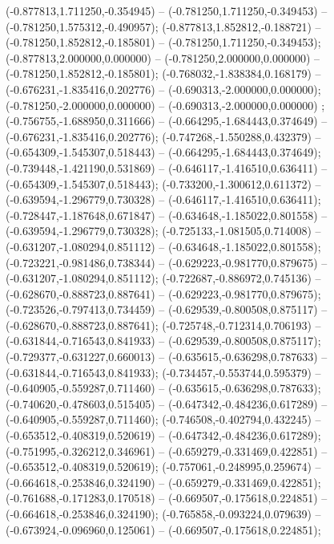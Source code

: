  (-0.877813,1.711250,-0.354945) -- (-0.781250,1.711250,-0.349453) -- (-0.781250,1.575312,-0.490957);
 (-0.877813,1.852812,-0.188721) -- (-0.781250,1.852812,-0.185801) -- (-0.781250,1.711250,-0.349453);
 (-0.877813,2.000000,0.000000) -- (-0.781250,2.000000,0.000000) -- (-0.781250,1.852812,-0.185801);
 (-0.768032,-1.838384,0.168179) -- (-0.676231,-1.835416,0.202776) -- (-0.690313,-2.000000,0.000000);
 (-0.781250,-2.000000,0.000000) -- (-0.690313,-2.000000,0.000000) ;
 (-0.756755,-1.688950,0.311666) -- (-0.664295,-1.684443,0.374649) -- (-0.676231,-1.835416,0.202776);
 (-0.747268,-1.550288,0.432379) -- (-0.654309,-1.545307,0.518443) -- (-0.664295,-1.684443,0.374649);
 (-0.739448,-1.421190,0.531869) -- (-0.646117,-1.416510,0.636411) -- (-0.654309,-1.545307,0.518443);
 (-0.733200,-1.300612,0.611372) -- (-0.639594,-1.296779,0.730328) -- (-0.646117,-1.416510,0.636411);
 (-0.728447,-1.187648,0.671847) -- (-0.634648,-1.185022,0.801558) -- (-0.639594,-1.296779,0.730328);
 (-0.725133,-1.081505,0.714008) -- (-0.631207,-1.080294,0.851112) -- (-0.634648,-1.185022,0.801558);
 (-0.723221,-0.981486,0.738344) -- (-0.629223,-0.981770,0.879675) -- (-0.631207,-1.080294,0.851112);
 (-0.722687,-0.886972,0.745136) -- (-0.628670,-0.888723,0.887641) -- (-0.629223,-0.981770,0.879675);
 (-0.723526,-0.797413,0.734459) -- (-0.629539,-0.800508,0.875117) -- (-0.628670,-0.888723,0.887641);
 (-0.725748,-0.712314,0.706193) -- (-0.631844,-0.716543,0.841933) -- (-0.629539,-0.800508,0.875117);
 (-0.729377,-0.631227,0.660013) -- (-0.635615,-0.636298,0.787633) -- (-0.631844,-0.716543,0.841933);
 (-0.734457,-0.553744,0.595379) -- (-0.640905,-0.559287,0.711460) -- (-0.635615,-0.636298,0.787633);
 (-0.740620,-0.478603,0.515405) -- (-0.647342,-0.484236,0.617289) -- (-0.640905,-0.559287,0.711460);
 (-0.746508,-0.402794,0.432245) -- (-0.653512,-0.408319,0.520619) -- (-0.647342,-0.484236,0.617289);
 (-0.751995,-0.326212,0.346961) -- (-0.659279,-0.331469,0.422851) -- (-0.653512,-0.408319,0.520619);
 (-0.757061,-0.248995,0.259674) -- (-0.664618,-0.253846,0.324190) -- (-0.659279,-0.331469,0.422851);
 (-0.761688,-0.171283,0.170518) -- (-0.669507,-0.175618,0.224851) -- (-0.664618,-0.253846,0.324190);
 (-0.765858,-0.093224,0.079639) -- (-0.673924,-0.096960,0.125061) -- (-0.669507,-0.175618,0.224851);
